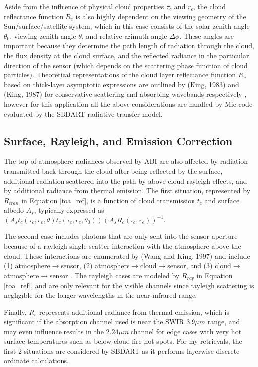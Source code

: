\documentclass[12pt]{article}
\begin{document}
Aside from the influence of physical cloud properties $\tau_c$ and $r_e$, the cloud reflectance function $R_c$ is also highly dependent on the viewing geometry of the Sun/surface/satellite system, which in this case consists of the solar zenith angle $\theta_0$, viewing zenith angle $\theta$, and relative azimuth angle $\Delta \phi$. These angles are important because they determine the path length of radiation through the cloud, the flux density at the cloud surface, and the reflected radiance in the particular direction of the sensor (which depends on the scattering phase function of cloud particles). Theoretical representations of the cloud layer reflectance function $R_c$ based on thick-layer asymptotic expressions are outlined by (King, 1983) and (King, 1987) for conservative-scattering and absorbing wavebands respectively \cite{king_determination_1987}\cite{king_number_1983}, however for this application all the above considerations are handled by Mie code evaluated by the SBDART radiative transfer model.

\subsection{Surface, Rayleigh, and Emission Correction}

The top-of-atmosphere radiances observed by ABI are also affected by radiation transmitted back through the cloud after being reflected by the surface, additional radiation scattered into the path by above-cloud rayleigh effects, and by additional radiance from thermal emission. The first situation, represented by $R_{tran}$ in Equation \ref{toa_ref}, is a function of cloud transmission $t_c$ and surface albedo $A_s$, typically expressed as $\left(A_s t_c(\tau_c, r_e, \theta) t_c(\tau_c, r_e, \theta_0)\right)\left(A_sR_c(\tau_c, r_e)\right)^{-1}$.

The second case includes photons that are only sent into the sensor aperture because of a rayleigh single-scatter interaction with the atmosphere above the cloud. These interactions are enumerated by (Wang and King, 1997) and include (1) atmosphere$\to$sensor, (2) atmosphere$\to$cloud$\to$sensor, and (3) cloud$\to$atmosphere$\to$sensor \cite{wang_correction_1997}. The rayleigh cases are modeled by $R_{ray}$ in Equation \ref{toa_ref}, and are only relevant for the visible channels since rayleigh scattering is negligible for the longer wavelengths in the near-infrared range.

Finally, $R_e$ represents additional radiance from thermal emission, which is significant if the absorption channel used is near the SWIR $3.9\mu m$ range, and may even influence results in the $2.24\mu m$ channel for edge cases with very hot surface temperatures such as below-cloud fire hot spots. For my retrievals, the first 2 situations are considered by SBDART as it performs layerwise discrete ordinate calculations.
\end{document}
